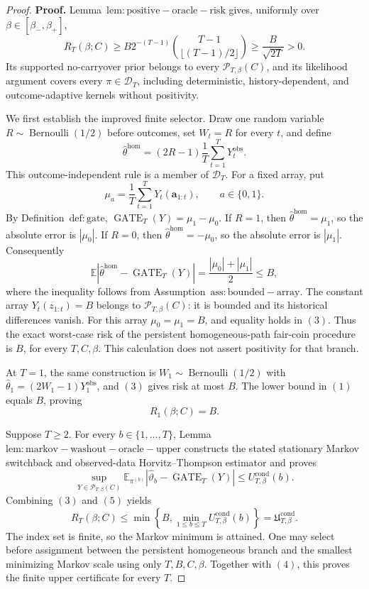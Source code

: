 \documentclass{article}
\begin{document}
\begin{proof}
\textbf{Proof.} Lemma~\(\mathrm{lem:positive-oracle-risk}\) gives, uniformly over \(\beta\in[\beta_-,\beta_+]\),
\[
R_T(\beta;C)\ge B2^{-(T-1)}\binom{T-1}{\lfloor(T-1)/2\rfloor}\ge\frac{B}{\sqrt{2T}}>0.
\tag{1}
\]
Its supported no-carryover prior belongs to every \(\mathcal P_{T,\beta}(C)\), and its likelihood argument covers every \(\pi\in\mathcal D_T\), including deterministic, history-dependent, and outcome-adaptive kernels without positivity.

We first establish the improved finite selector. Draw one random variable \(R\sim\operatorname{Bernoulli}(1/2)\) before outcomes, set \(W_t=R\) for every \(t\), and define
\[
\widehat\theta^{\mathrm{hom}}=(2R-1)\frac1T\sum_{t=1}^T Y_t^{\mathrm{obs}}.
\tag{2}
\]
This outcome-independent rule is a member of \(\mathcal D_T\). For a fixed array, put
\[
\mu_a=\frac1T\sum_{t=1}^T Y_t(\mathbf a_{1:t}),\qquad a\in\{0,1\}.
\]
By Definition~\(\mathrm{def:gate}\), \(\operatorname{GATE}_T(Y)=\mu_1-\mu_0\). If \(R=1\), then \(\widehat\theta^{\mathrm{hom}}=\mu_1\), so the absolute error is \(|\mu_0|\). If \(R=0\), then \(\widehat\theta^{\mathrm{hom}}=-\mu_0\), so the absolute error is \(|\mu_1|\). Consequently
\[
\mathbb E\left|\widehat\theta^{\mathrm{hom}}-\operatorname{GATE}_T(Y)\right|
=\frac{|\mu_0|+|\mu_1|}{2}
\le B,
\tag{3}
\]
where the inequality follows from Assumption~\(\mathrm{ass:bounded-array}\). The constant array \(Y_t(z_{1:t})=B\) belongs to \(\mathcal P_{T,\beta}(C)\): it is bounded and its historical differences vanish. For this array \(\mu_0=\mu_1=B\), and equality holds in \((3)\). Thus the exact worst-case risk of the persistent homogeneous-path fair-coin procedure is \(B\), for every \(T,C,\beta\). This calculation does not assert positivity for that branch.

At \(T=1\), the same construction is \(W_1\sim\operatorname{Bernoulli}(1/2)\) with \(\widehat\theta_1=(2W_1-1)Y_1^{\mathrm{obs}}\), and \((3)\) gives risk at most \(B\). The lower bound in \((1)\) equals \(B\), proving
\[
R_1(\beta;C)=B.
\tag{4}
\]

Suppose \(T\ge2\). For every \(b\in\{1,\ldots,T\}\), Lemma~\(\mathrm{lem:markov-washout-oracle-upper}\) constructs the stated stationary Markov switchback and observed-data Horvitz--Thompson estimator and proves
\[
\sup_{Y\in\mathcal P_{T,\beta}(C)}
\mathbb E_{\pi^{(b)}}\left|\widehat\vartheta_b-\operatorname{GATE}_T(Y)\right|
\le U_{T,\beta}^{\mathrm{cond}}(b).
\tag{5}
\]
Combining \((3)\) and \((5)\) yields
\[
R_T(\beta;C)
\le\min\left\{B,\min_{1\le b\le T}U_{T,\beta}^{\mathrm{cond}}(b)\right\}
=\mathfrak U_{T,\beta}^{\mathrm{cond}}.
\tag{6}
\]
The index set is finite, so the Markov minimum is attained. One may select before assignment between the persistent homogeneous branch and the smallest minimizing Markov scale using only \(T,B,C,\beta\). Together with \((4)\), this proves the finite upper certificate for every \(T\).


\end{proof}
\end{document}
